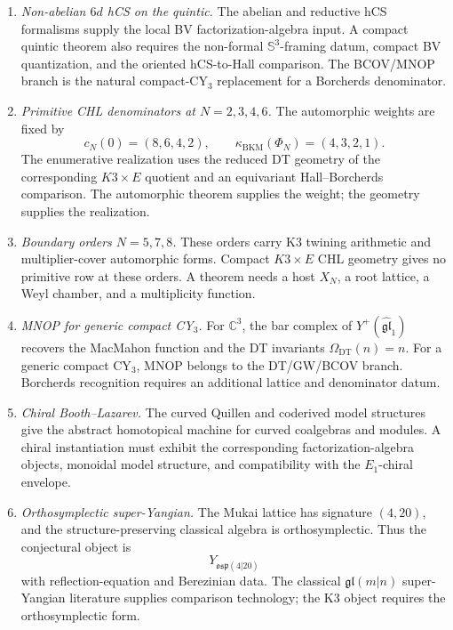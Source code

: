\documentclass[10pt]{article}
\providecommand{\kBKM}{\kappa_{\mathrm{BKM}}}
\providecommand{\Eone}{E_1}
\begin{document}
\begin{enumerate}
\item \emph{Non-abelian \(6d\) hCS on the quintic.}
The abelian and reductive hCS formalisms supply the local BV
factorization-algebra input.  A compact quintic theorem also requires
the non-formal \(\mathbb S^3\)-framing datum, compact BV quantization,
and the oriented hCS-to-Hall comparison.  The BCOV/MNOP branch is the
natural compact-CY\(_3\) replacement for a Borcherds denominator.

\item \emph{Primitive CHL denominators at \(N=2,3,4,6\).}
The automorphic weights are fixed by
\[
        c_N(0)=(8,6,4,2),\qquad
        \kBKM(\Phi_N)=(4,3,2,1).
\]
The enumerative realization uses the reduced DT geometry of the
corresponding \(K3\times E\) quotient and an equivariant Hall--Borcherds
comparison.  The automorphic theorem supplies the weight; the
geometry supplies the realization.

\item \emph{Boundary orders \(N=5,7,8\).}
These orders carry K3 twining arithmetic and multiplier-cover
automorphic forms.  Compact \(K3\times E\) CHL
geometry gives no primitive row at these orders.  A theorem needs a
host \(X_N\), a root lattice, a Weyl chamber, and a multiplicity
function.

\item \emph{MNOP for generic compact CY\(_3\).}
For \(\mathbb C^3\), the bar complex of \(Y^+(\widehat{\mathfrak{gl}}_1)\)
recovers the MacMahon function and the DT invariants
\(\Omega_{\mathrm{DT}}(n)=n\).  For a generic compact CY\(_3\), MNOP
belongs to the DT/GW/BCOV branch.  Borcherds recognition requires an
additional lattice and denominator datum.

\item \emph{Chiral Booth--Lazarev.}
The curved Quillen and coderived model structures give the abstract
homotopical machine for curved coalgebras and modules.  A chiral
instantiation must exhibit the corresponding factorization-algebra
objects, monoidal model structure, and compatibility with the
\(\Eone\)-chiral envelope.

\item \emph{Orthosymplectic super-Yangian.}
The Mukai lattice has signature \((4,20)\), and the structure-preserving
classical algebra is orthosymplectic.  Thus the conjectural object is
\[
        Y_{\mathfrak{osp}(4|20)}
\]
with reflection-equation and Berezinian data.  The classical
\(\mathfrak{gl}(m|n)\) super-Yangian literature supplies comparison
technology; the K3 object requires the orthosymplectic form.


\end{enumerate}
\end{document}
